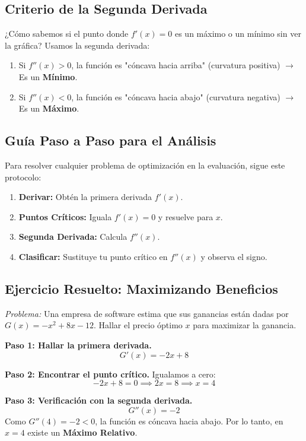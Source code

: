 \documentclass[12pt,a4paper,openany,oneside]{book}
\begin{document}
\subsection{Criterio de la Segunda Derivada}
¿Cómo sabemos si el punto donde $f'(x)=0$ es un máximo o un mínimo sin ver la gráfica? Usamos la segunda derivada:
\begin{enumerate}
    \item Si $f''(x) > 0$, la función es "cóncava hacia arriba" (curvatura positiva) $\rightarrow$ Es un \textbf{Mínimo}.
    \item Si $f''(x) < 0$, la función es "cóncava hacia abajo" (curvatura negativa) $\rightarrow$ Es un \textbf{Máximo}.
\end{enumerate}

\subsection{Guía Paso a Paso para el Análisis}
Para resolver cualquier problema de optimización en la evaluación, sigue este protocolo:
\begin{enumerate}
    \item \textbf{Derivar:} Obtén la primera derivada $f'(x)$.
    \item \textbf{Puntos Críticos:} Iguala $f'(x) = 0$ y resuelve para $x$.
    \item \textbf{Segunda Derivada:} Calcula $f''(x)$.
    \item \textbf{Clasificar:} Sustituye tu punto crítico en $f''(x)$ y observa el signo.
\end{enumerate}

\subsection{Ejercicio Resuelto: Maximizando Beneficios}
\textit{Problema:} Una empresa de software estima que sus ganancias están dadas por $G(x) = -x^2 + 8x - 12$. Hallar el precio óptimo $x$ para maximizar la ganancia.

\textbf{Paso 1: Hallar la primera derivada.}
\[
G'(x) = -2x + 8
\]

\textbf{Paso 2: Encontrar el punto crítico.}
Igualamos a cero:
\[
-2x + 8 = 0 \implies 2x = 8 \implies x = 4
\]

\textbf{Paso 3: Verificación con la segunda derivada.}
\[
G''(x) = -2
\]
Como $G''(4) = -2 < 0$, la función es cóncava hacia abajo. Por lo tanto, en \textbf{$x = 4$} existe un \textbf{Máximo Relativo}.
\end{document}
